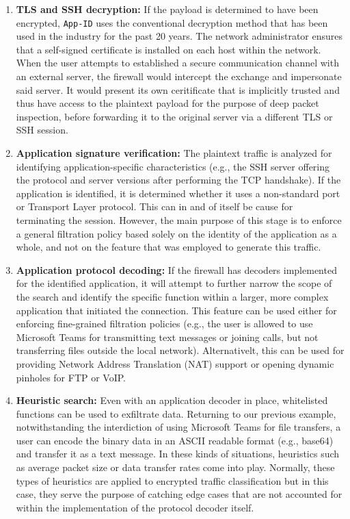 \begin{enumerate}
    \item \textbf{TLS and SSH decryption:} If the payload is determined to have
    been encrypted, \texttt{App-ID} uses the conventional decryption method that
    has been used in the industry for the past 20 years. The network administrator
    ensures that a self-signed certificate is installed on each host within the
    network. When the user attempts to established a secure communication
    channel with an external server, the firewall would intercept the exchange
    and impersonate said server. It would present its own ceritificate that is
    implicitly trusted and thus have access to the plaintext payload for the
    purpose of deep packet inspection, before forwarding it to the original
    server via a different TLS or SSH session.

    \item \textbf{Application signature verification:} The plaintext traffic is
    analyzed for identifying application-specific characteristics (e.g., the
    SSH server offering the protocol and server versions after performing the
    TCP handshake). If the application is identified, it is determined whether
    it uses a non-standard port or Transport Layer protocol. This can in and of
    itself be cause for terminating the session. However, the main purpose of
    this stage is to enforce a general filtration policy based solely on the
    identity of the application as a whole, and not on the feature that was
    employed to generate this traffic.

    \item \textbf{Application protocol decoding:} If the firewall has decoders
    implemented for the identified application, it will attempt to further
    narrow the scope of the search and identify the specific function within
    a larger, more complex application that initiated the connection. This feature
    can be used either for enforcing fine-grained filtration policies (e.g., the
    user is allowed to use Microsoft Teams for transmitting text messages or
    joining calls, but not transferring files outside the local network).
    Alternativelt, this can be used for providing Network Address Translation (NAT)
    support or opening dynamic pinholes for FTP or VoIP.

    \item \textbf{Heuristic search:} Even with an application decoder in place,
    whitelisted functions can be used to exfiltrate data. Returning to our
    previous example, notwithstanding the interdiction of using Microsoft Teams
    for file transfers, a user can encode the binary data in an ASCII readable
    format (e.g., base64) and transfer it as a text message. In these kinds of
    situations, heuristics such as average packet size or data transfer rates
    come into play. Normally, these types of heuristics are applied to encrypted
    traffic classification but in this case, they serve the purpose of catching
    edge cases that are not accounted for within the implementation of the
    protocol decoder itself.
\end{enumerate}

